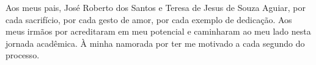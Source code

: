 \begin{dedicatoria}
   \vspace*{\fill}
   \begin{flushright} 
        \parbox{0.6\linewidth}{
		 {
            Aos meus pais, José Roberto dos Santos e Teresa de Jesus de Souza Aguiar, por cada sacrifício, por cada gesto de amor, por cada exemplo de dedicação. Aos meus irmãos por acreditaram em meu potencial e caminharam ao meu lado nesta jornada acadêmica. À minha namorada por ter me motivado a cada segundo do processo.
		}
		}
   \end{flushright} 
   \vspace{2cm}
	 
\end{dedicatoria}